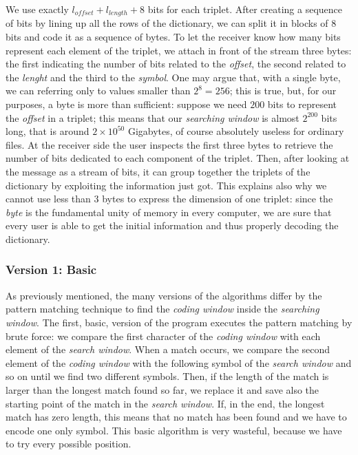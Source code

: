 We use exactly $l_{offset} + l_{length} + 8$ bits for each triplet. After creating a sequence of bits by lining up all the rows of the dictionary, we can split it in blocks of $8$ bits and code it as a sequence of bytes. To let the receiver know how many bits represent each element of the triplet, we attach in front of the stream three bytes: the first indicating the number of bits related to the \textit{offset}, the second related to the \textit{lenght} and the third to the \textit{symbol}. One may argue that, with a single byte, we can referring only to values smaller than $2^8 = 256$; this is true, but, for our purposes, a byte is more than sufficient: suppose we need $200$ bits to represent the \textit{offset} in a triplet; this means that our \textit{searching window} is almost $2^{200}$ bits long, that is around $2 \times 10^{50}$ Gigabytes, of course absolutely useless for ordinary files. At the receiver side the user inspects the first three bytes to retrieve the number of bits dedicated to each component of the triplet. Then, after looking at the message as a stream of bits, it can group together the triplets of the dictionary by exploiting the information just got. This explains also why we cannot use less than $3$ bytes to express the dimension of one triplet: since the \textit{byte} is the fundamental unity of memory in every computer, we are sure that every user is able to get the initial information and thus properly decoding the dictionary. 

\subsubsection{Version 1: Basic}
As previously mentioned, the many versions of the algorithms differ by the pattern matching technique to find the \textit{coding window} inside the \textit{searching window}. The first, basic, version of the program executes the pattern matching by brute force: we compare the first character of the \textit{coding window} with each element of the \textit{search window}. When a match occurs, we compare the second element of the \textit{coding window} with the following symbol of the \textit{search window} and so on until we find two different symbols. Then, if the length of the match is larger than the longest match found so far, we replace it and save also the starting point of the match in the \textit{search window}. If, in the end, the longest match has zero length, this means that no match has been found and we have to encode one only symbol. This basic algorithm is very wasteful, because we have to try every possible position.

